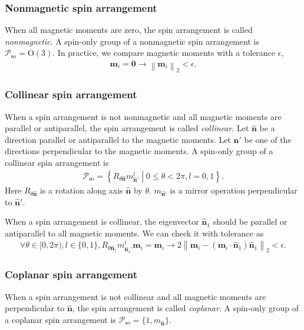 \documentclass[a4paper, 11pt]{article}
\theoremstyle{definition}
\newcommand{\term}[1]{\textit{#1}}
\newcommand{\norm}[1]{\left\lVert#1\right\rVert}
\newcommand{\relmiddle}[1]{\mathrel{}\middle#1\mathrel{}}
\newcommand{\set}[2]{\left\{ #1 \relmiddle| #2 \right\}}
\begin{document}
\subsubsection{Nonmagnetic spin arrangement}

When all magnetic moments are zero, the spin arrangement is called \term{nonmagnetic}.
A spin-only group of a nonmagnetic spin arrangement is $\mathcal{P}_{\mathrm{so}} = \mathrm{O}(3)$.
In practice, we compare magnetic moments with a tolerance $\epsilon$,
\begin{align}
  \bm{m}_{i} = \bm{0} \rightarrow \norm{ \bm{m}_{i} }_{2} < \epsilon.
\end{align}

\subsubsection{Collinear spin arrangement}

When a spin arrangement is not nonmagnetic and all magnetic moments are parallel or antiparallel, the spin arrangement is called \term{collinear}.
Let $\hat{\bm{n}}$ be a direction parallel or antiparallel to the magnetic moments.
Let $\hat{\bm{n}}'$ be one of the directions perpendicular to the magnetic moments.
A spin-only group of a collinear spin arrangement is
\begin{align*}
  \mathcal{P}_{\mathrm{so}}
    = \set{ R_{\theta \hat{\bm{n}}} m_{\hat{\bm{n}}'}^{l} }{ 0 \leq \theta < 2 \pi, l=0, 1 }.
\end{align*}
Here $R_{\theta \hat{\bm{n}}}$ is a rotation along axis $\hat{\bm{n}}$ by $\theta$.
$m_{\hat{\bm{n}}'}$ is a mirror operation perpendicular to $\hat{\bm{n}}'$.

When a spin arrangement is collinear, the eigenvector $\hat{\bm{n}}_{1}$ should be parallel or antiparallel to all magnetic moments.
We can check it with tolerance as
\begin{align}
  \forall \theta \in [0, 2 \pi ), l \in \{ 0, 1 \}, R_{\theta \hat{\bm{n}}_{1}} m_{\hat{\bm{n}}_{1}'}^{l} \bm{m}_{i} = \bm{m}_{i}
  \rightarrow
  2 \norm{ \bm{m}_{i} - (\bm{m}_{i} \cdot \hat{\bm{n}}_{1})\hat{\bm{n}}_{1} }_{2} < \epsilon.
\end{align}

\subsubsection{Coplanar spin arrangement}

When a spin arrangement is not collinear and all magnetic moments are perpendicular to $\hat{\bm{n}}$, the spin arrangement is called \term{coplanar}.
A spin-only group of a coplanar spin arrangement is $\mathcal{P}_{\mathrm{so}} = \{ 1, m_{\hat{\bm{n}}} \}$.
\end{document}
